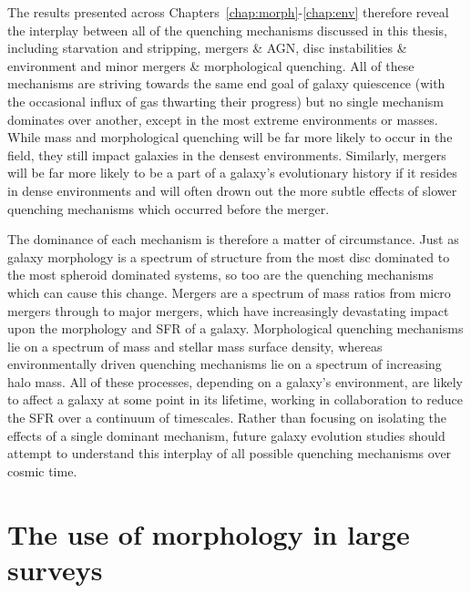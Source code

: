 The results presented across Chapters~\ref{chap:morph}-\ref{chap:env} therefore reveal the interplay between all of the quenching mechanisms discussed in this thesis, including starvation and stripping, mergers \& AGN, disc instabilities \&  environment and minor mergers \& morphological quenching. All of these mechanisms are striving towards the same end goal of galaxy quiescence (with the occasional influx of gas thwarting their progress) but no single mechanism dominates over another, except in the most extreme environments or masses. While mass and morphological quenching will be far more likely to occur in the field, they still impact galaxies in the densest environments. Similarly, mergers will be far more likely to be a part of a galaxy's evolutionary history if it resides in dense environments and will often drown out the more subtle effects of slower quenching mechanisms which occurred before the merger. 

The dominance of each mechanism is therefore a matter of circumstance. Just as galaxy morphology is a spectrum of structure from the most disc dominated to the most spheroid dominated systems, so too are the quenching mechanisms which can cause this change. Mergers are a spectrum of mass ratios from micro mergers \citep{carlin16} through to major mergers, which have increasingly devastating impact upon the morphology and SFR of a galaxy. Morphological quenching mechanisms lie on a spectrum of mass and stellar mass surface density, whereas environmentally driven quenching mechanisms lie on a spectrum of increasing halo mass. All of these processes, depending on a galaxy's environment, are likely to affect a galaxy at some point in its lifetime, working in collaboration to reduce the SFR over a continuum of timescales. Rather than focusing on isolating the effects of a single  dominant mechanism, future galaxy evolution studies should attempt to understand this interplay of all possible quenching mechanisms over cosmic time. 

\section{The use of morphology in large surveys}\label{sec:usemorph}

